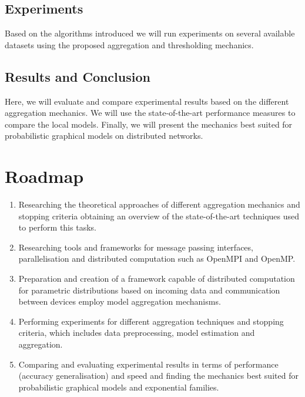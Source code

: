   \subsection{Experiments}
  Based on the algorithms introduced we will run experiments on several available datasets using the proposed aggregation and thresholding mechanics.

  \subsection{Results and Conclusion}
  Here, we will evaluate and compare experimental results based on the different aggregation mechanics. 
  We will use the state-of-the-art performance measures to compare the local models.
  Finally, we will present the mechanics best suited for probabilistic graphical models on distributed networks.

  \section{Roadmap}
  \begin{enumerate}
       \item Researching the theoretical approaches of different aggregation mechanics and stopping criteria obtaining an overview of the state-of-the-art techniques used to perform this tasks.
       \item Researching tools and frameworks for message passing interfaces, parallelisation and distributed computation such as OpenMPI\cite{gabriel04:_open_mpi} and OpenMP.
       \item Preparation and creation of a framework capable of distributed computation for parametric distributions based on incoming data and communication between devices employ model aggregation mechanisms.
       \item Performing experiments for different aggregation techniques and stopping criteria, which includes data preprocessing, model estimation and aggregation.
       \item Comparing and evaluating experimental results in terms of performance (accuracy generalisation) and speed and finding the mechanics best suited for probabilistic graphical models and exponential families.
    \end{enumerate}
